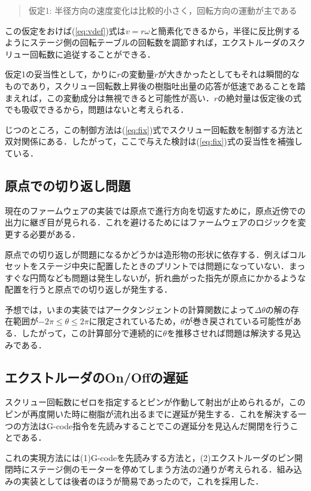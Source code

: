 \documentclass[twocolumn,oneside,a4paper]{article}
\begin{document}
\begin{quote}
	仮定1: 半径方向の速度変化は比較的小さく，回転方向の運動が主である
\end{quote}

この仮定をおけば(\ref{eq:vdef})式は$v=r \omega$と簡素化できるから，半径に反比例するようにステージ側の回転テーブルの回転数を調節すれば，エクストルーダのスクリュー回転数に追従することができる．

仮定1の妥当性として，かりに$r$の変動量$\dot{r}$が大きかったとしてもそれは瞬間的なものであり，スクリュー回転数上昇後の樹脂吐出量の応答が低速であることを踏まえれば，この変動成分は無視できると可能性が高い．$r$の絶対量は仮定後の式でも吸収できるから，問題はないと考えられる．

じつのところ，この制御方法は(\ref{eq:fix})式でスクリュー回転数を制御する方法と双対関係にある．したがって，ここで与えた検討は(\ref{eq:fix})式の妥当性を補強している．


\subsection{原点での切り返し問題}
現在のファームウェアの実装では原点で進行方向を切返すために，原点近傍での出力に継ぎ目が見られる．これを避けるためにはファームウェアのロジックを変更する必要がある．

原点での切り返しが問題になるかどうかは造形物の形状に依存する．例えばコルセットをステージ中央に配置したときのプリントでは問題になっていない．まっすぐな円筒なども問題は発生しないが，折れ曲がった指先が原点にかかるような配置を行うと原点での切り返しが発生する．

予想では，いまの実装ではアークタンジェントの計算関数によって$\Delta \theta$の解の存在範囲が$-2 \pi \leq \theta \leq  2 \pi$に限定されているため，$\theta$が巻き戻されている可能性がある．したがって，この計算部分で連続的に$\theta$を推移させれば問題は解決する見込みである．

\subsection{エクストルーダのOn/Offの遅延}
スクリュー回転数にゼロを指定するとピンが作動して射出が止められるが，このピンが再度開いた時に樹脂が流れ出るまでに遅延が発生する．これを解決する一つの方法はG-code指令を先読みすることでこの遅延分を見込んだ開閉を行うことである．

これの実現方法には(1)G-codeを先読みする方法と，(2)エクストルーダのピン開閉時にステージ側のモーターを停めてしまう方法の2通りが考えられる．組み込みの実装としては後者のほうが簡易であったので，これを採用した．
\end{document}
